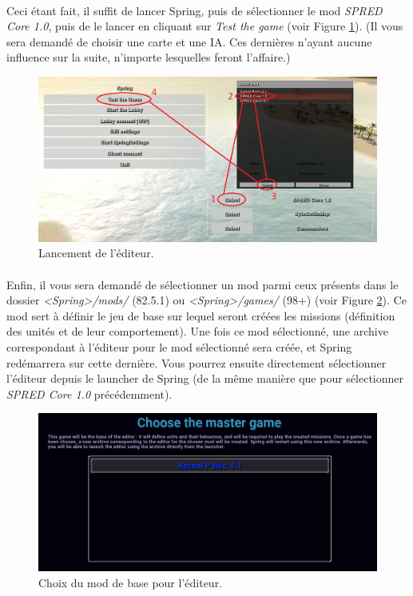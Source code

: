 \documentclass[a4paper]{article}
\begin{document}
\paragraph{ }
Ceci étant fait, il suffit de lancer Spring, puis de sélectionner le mod \textit{SPRED Core 1.0}, puis de le lancer en cliquant sur \textit{Test the game} (voir Figure \ref{fig:editor-spring-launcher}). (Il vous sera demandé de choisir une carte et une IA. Ces dernières n'ayant aucune influence sur la suite, n'importe lesquelles feront l'affaire.)
\begin{figure}[H]
\centering
\includegraphics[width=\linewidth]{editor-spring-launcher.png}
\caption{Lancement de l'éditeur.}
\label{fig:editor-spring-launcher}
\end{figure}
\paragraph{ }
Enfin, il vous sera demandé de sélectionner un mod parmi ceux présents dans le dossier \textit{<Spring>/mods/} (82.5.1) ou \textit{<Spring>/games/} (98+) (voir Figure \ref{fig:pre-launcher}). Ce mod sert à définir le jeu de base sur lequel seront créées les missions (définition des unités et de leur comportement). Une fois ce mod sélectionné, une archive correspondant à l'éditeur pour le mod sélectionné sera créée, et Spring redémarrera sur cette dernière. Vous pourrez ensuite directement sélectionner l'éditeur depuis le launcher de Spring (de la même manière que pour sélectionner \textit{SPRED Core 1.0} précédemment).
\begin{figure}[H]
\centering
\includegraphics[width=\linewidth]{pre-launcher.png}
\caption{Choix du mod de base pour l'éditeur.}
\label{fig:pre-launcher}
\end{figure}
\end{document}
